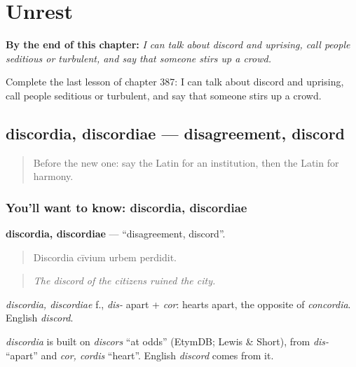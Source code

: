 
\chapter{Unrest}
\label{ch:la-unrest}

\begin{chapteropening}
\textbf{By the end of this chapter:} \emph{I can talk about discord and uprising, call people seditious or turbulent, and say that someone stirs up a crowd.}

Complete the last lesson of chapter 387: I can talk about discord and uprising, call people seditious or turbulent, and say that someone stirs up a crowd.
\end{chapteropening}

\section[discordia, discordiae]{discordia, discordiae — disagreement, discord}

\label{lesson:LA-C387-discordia}



\begin{quote}
Before the new one: say the Latin for an institution, then the Latin for harmony.
\end{quote}

\subsection*{You'll want to know: discordia, discordiae}
\textbf{discordia, discordiae} — \textquotedblleft{}disagreement, discord\textquotedblright{}.

\begin{quote}
Discordia cīvium urbem perdidit.
\end{quote}

\begin{quote}
\emph{The discord of the citizens ruined the city.}
\end{quote}

\emph{discordia, discordiae} f., \emph{dis-} apart + \emph{cor}: hearts apart, the opposite of \emph{concordia}. English \emph{discord}.

\begin{cousinweb}
\emph{discordia} is built on \emph{discors} \textquotedblleft{}at odds\textquotedblright{} (EtymDB; Lewis \& Short), from \emph{dis-} \textquotedblleft{}apart\textquotedblright{} and \emph{cor, cordis} \textquotedblleft{}heart\textquotedblright{}. English \emph{discord} comes from it.
\end{cousinweb}


